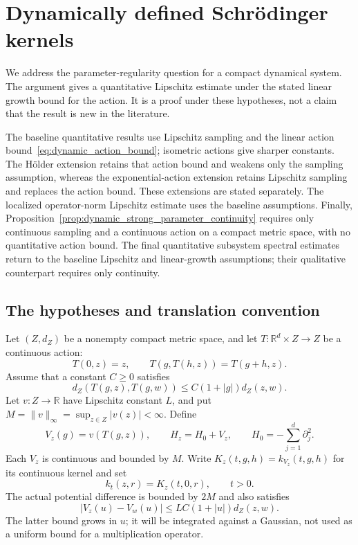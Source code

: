 \def\topic{Dynamically defined Schr\"odinger kernels}

\section{Dynamically defined Schr\"odinger kernels}
\label{sec:dynamical_schrodinger}
We address the parameter-regularity question for a compact dynamical
system. The argument gives a quantitative Lipschitz estimate under the
stated linear growth bound for the action. It is a proof under these
hypotheses, not a claim that the result is new in the literature.

The baseline quantitative results use Lipschitz sampling and the linear
action bound~\eqref{eq:dynamic_action_bound}; isometric actions give
sharper constants. The H\"older extension retains that action bound
and weakens only the sampling assumption, whereas the exponential-action
extension retains Lipschitz sampling and replaces the action bound.
These extensions are stated separately. The localized operator-norm
Lipschitz estimate uses the baseline assumptions. Finally,
Proposition~\ref{prop:dynamic_strong_parameter_continuity} requires only
continuous sampling and a continuous action on a compact metric space,
with no quantitative action bound. The final quantitative subsystem spectral estimates
return to the baseline Lipschitz and linear-growth assumptions; their
qualitative counterpart requires only continuity.

\subsection{The hypotheses and translation convention}
Let $(Z,d_Z)$ be a nonempty compact metric space, and let
$T:\mathbb R^d\times Z\to Z$ be a continuous action:
\[
T(0,z)=z,\qquad T(g,T(h,z))=T(g+h,z).
\]
Assume that a constant $C\geq0$ satisfies
\[
d_Z(T(g,z),T(g,w))\leq C(1+|g|)d_Z(z,w).
\tag{D}\label{eq:dynamic_action_bound}
\]
Let $v:Z\to\mathbb R$ have Lipschitz constant $L$, and put
$M=\|v\|_\infty=\sup_{z\in Z}|v(z)|<\infty$. Define
\[
V_z(g)=v(T(g,z)),\qquad H_z=H_0+V_z,\qquad
H_0=-\sum_{j=1}^d\partial_j^2.
\]
Each $V_z$ is continuous and bounded by $M$. Write
$K_z(t,g,h)=k_{V_z}(t,g,h)$ for its continuous kernel and set
\[
k_t(z,r)=K_z(t,0,r),\qquad t>0.
\]
The actual potential difference is bounded by $2M$ and also satisfies
\[
|V_z(u)-V_w(u)|\leq LC(1+|u|)d_Z(z,w).
\tag{P}\label{eq:dynamic_potential_difference}
\]
The latter bound grows in $u$; it will be integrated against a Gaussian,
not used as a uniform bound for a multiplication operator.


